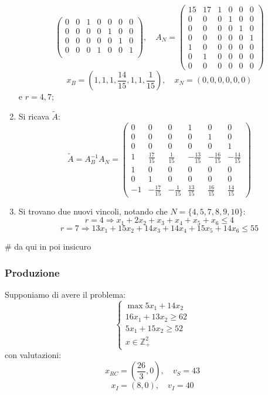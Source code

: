 \documentclass[a4paper,11pt]{article}
\begin{document}
\begin{enumerate}
$$\begin{pmatrix}
		0 & 0 & 1 & 0 & 0 & 0 & 0 \\
		0 & 0 & 0 & 0 & 1 & 0 & 0 \\
		0 & 0 & 0 & 0 & 0 & 1 & 0 \\
		0 & 0 & 0 & 1 & 0 & 0 & 1 \\
	\end{pmatrix}, \quad 
	A_N = 
	\begin{pmatrix}
		15 & 17 & 1 & 0 & 0 & 0 \\ 
		0 & 0 & 0 & 1 & 0 & 0 \\ 
		0 & 0 & 0 & 0 & 1 & 0 \\ 
		0 & 0 & 0 & 0 & 0 & 1 \\ 
		1 & 0 & 0 & 0 & 0 & 0 \\ 
		0 & 1 & 0 & 0 & 0 & 0 \\
		0 & 0 & 0 & 0 & 0 & 0
	\end{pmatrix}
	$$
	$$
	x_B =
	\left(
		1, 1, 1, \frac{14}{15}, 1, 1, \frac{1}{15}
	\right), \quad 
	x_N = 
	\left(
		0, 0, 0, 0, 0, 0
	\right)
	$$
	e $r= 4, 7$;
\item Si ricava $\tilde{A}$:
	$$
	\tilde{A} = A_B^{-1} A_N = 
	\begin{pmatrix}
		0 & 0 & 0 & 1 & 0 & 0 \\ 
		0 & 0 & 0 & 0 & 1 & 0 \\ 
		0 & 0 & 0 & 0 & 0 & 1 \\ 
		1 & \frac{17}{15} & \frac{1}{15} & -\frac{13}{15} & -\frac{16}{15} & -\frac{14}{15} \\ 
		1 & 0 & 0 & 0 & 0 & 0 \\ 
		0 & 1 & 0 & 0 & 0 & 0 \\ 
		-1 & -\frac{17}{15} & -\frac{1}{15} & \frac{13}{15} & \frac{16}{15} & \frac{14}{15}
	\end{pmatrix} 
	$$
\item Si trovano due nuovi vincoli, notando che $N = \{ 4, 5, 7, 8, 9, 10 \}$:
$$
r=4 \Rightarrow x_1 + 2x_2 + x_3 + x_4 + x_5 + x_6 \leq 4 
$$
$$
r=7 \Rightarrow 13 x_1 + 15 x_2 + 14 x_3 + 14 x_4 + 15 x_5 + 14 x_6 \leq 55
$$
\end{enumerate}

# da qui in poi insicuro

\subsubsection{Produzione}
Supponiamo di avere il problema:
\[
	\begin{cases}
		\max 5 x_1 + 14 x_2 \\ 
		16 x_1 + 13 x_2 \geq 62 \\ 
		5 x_1 + 15 x_2 \geq 52 \\
		x \in \mathbb{Z}^2_+
	\end{cases}
\]
con valutazioni:
$$ x_{RC} = \left( \frac{26}{3}, 0 \right), \quad v_S = 43 $$
$$ x_I = \left( 8, 0 \right), \quad  v_I = 40 $$
\end{document}
